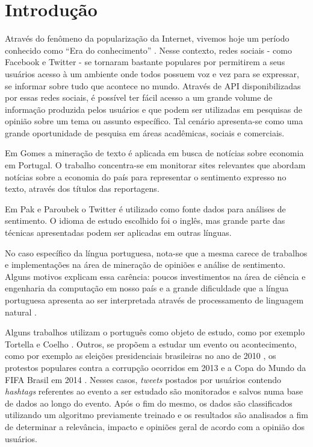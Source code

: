 \chapter{Introdução} \label{cap:1}

Através do fenômeno da popularização da Internet, vivemos hoje um período conhecido como \enquote{Era do conhecimento} \cite{lastres1999informaccao}.
Nesse contexto, redes sociais - como Facebook e Twitter - se tornaram bastante populares por permitirem a seus usuários acesso à um ambiente onde todos possuem voz e vez para se expressar, se informar sobre tudo que acontece no mundo.
Através de \ac{API} disponibilizadas por essas redes sociais, é possível ter fácil acesso a um grande volume de informação produzida pelos usuários e que podem ser utilizadas em pesquisas de opinião sobre um tema ou assunto específico. Tal cenário apresenta-se como uma grande oportunidade de pesquisa em áreas acadêmicas, sociais e comerciais.

Em Gomes \cite{gomes2013text} a mineração de texto é aplicada em busca de notícias sobre economia em Portugal. O trabalho concentra-se em monitorar sites relevantes que abordam notícias sobre a economia do país para representar o sentimento expresso no texto, através dos títulos das reportagens.

Em Pak e Paroubek \cite{pak2010twitter} o Twitter é utilizado como fonte dados para análises de sentimento. O idioma de estudo escolhido foi o inglês, mas grande parte das técnicas apresentadas podem ser aplicadas em outras línguas.

No caso específico da língua portuguesa, nota-se que a mesma carece de trabalhos e implementações na área de mineração de opiniões e análise de sentimento. Alguns motivos explicam essa carência: poucos investimentos na área de ciência e engenharia da computação em nosso país e a grande dificuldade que a língua portuguesa apresenta ao ser interpretada através de processamento de linguagem natural \cite{santos2000projecto}.

Alguns trabalhos utilizam o português como objeto de estudo, como por exemplo Tortella e Coelho \cite{tortellaanalise}. Outros, se propõem a estudar um evento ou acontecimento, como por exemplo as eleições presidenciais brasileiras no ano de 2010 \cite{rodrigues2012characterizing}, os protestos populares contra a corrupção ocorridos em 2013 \cite{franca2014analise} e a Copa do Mundo da FIFA Brasil em 2014 \cite{carvalho2014mineraccao}. Nesses casos, \textit{tweets} postados por usuários contendo \textit{hashtags} referentes ao evento a ser estudado são monitorados e salvos numa base de dados ao longo do evento. Após o fim do mesmo, os dados são classificados utilizando um algoritmo previamente treinado e os resultados são analisados a fim de determinar a relevância, impacto e opiniões geral de acordo com a opinião dos usuários.

